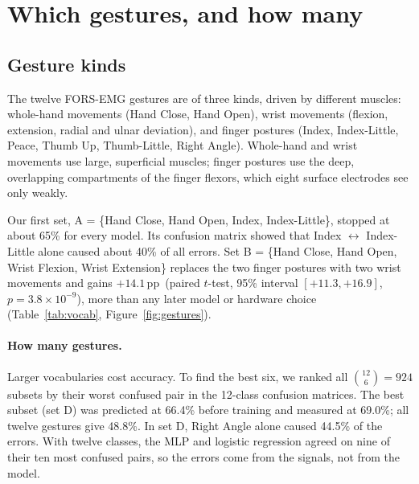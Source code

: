 \documentclass[11pt,a4paper]{article}
\newcommand{\pp}{\,pp}
\begin{document}
\section{Which gestures, and how many}\label{sec:gestures}
\subsection{Gesture kinds}
The twelve FORS-EMG gestures are of three kinds, driven by different muscles: whole-hand movements (Hand
Close, Hand Open), wrist movements (flexion, extension, radial and ulnar deviation), and finger postures
(Index, Index-Little, Peace, Thumb Up, Thumb-Little, Right Angle). Whole-hand and wrist movements use large,
superficial muscles; finger postures use the deep, overlapping compartments of the finger flexors, which eight
surface electrodes see only weakly.

Our first set, A = \{Hand Close, Hand Open, Index, Index-Little\}, stopped at about 65\% for every model.
Its confusion matrix showed that Index $\leftrightarrow$ Index-Little alone caused about 40\% of all errors.
Set B = \{Hand Close, Hand Open, Wrist Flexion, Wrist Extension\} replaces the two finger postures with two
wrist movements and gains $+14.1$\pp\ (paired $t$-test, 95\% interval $[+11.3,+16.9]$,
$p=3.8\times10^{-9}$), more than any later model or hardware choice (Table~\ref{tab:vocab},
Figure~\ref{fig:gestures}).

\paragraph{How many gestures.} Larger vocabularies cost accuracy. To find the best six, we ranked all
$\binom{12}{6}=924$ subsets by their worst confused pair in the 12-class confusion matrices. The best subset
(set D) was predicted at 66.4\% before training and measured at 69.0\%; all twelve gestures give 48.8\%.
In set D, Right Angle alone caused 44.5\% of the errors. With twelve classes, the MLP and logistic regression
agreed on nine of their ten most confused pairs, so the errors come from the signals, not from the model.
\end{document}
